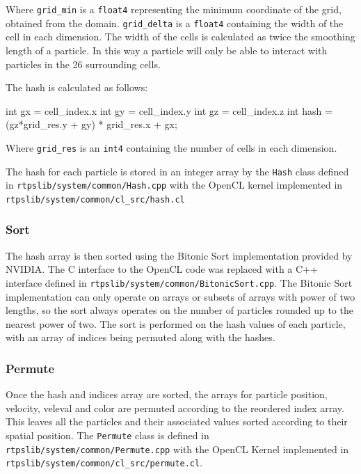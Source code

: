 Where \verb|grid_min| is a \verb|float4| representing the minimum coordinate of
the grid, obtained from the domain. \verb|grid_delta| is a \verb|float4|
containing the width of the cell in each dimension. The width of the cells is
calculated as twice the smoothing length of a particle. In this way a particle
will only be able to interact with particles in the 26 surrounding cells.


The hash is calculated as follows:
\begin{cppcode}{0}
int gx = cell_index.x
int gy = cell_index.y
int gz = cell_index.z
int hash = (gz*grid_res.y + gy) * grid_res.x + gx;
\end{cppcode}

Where \verb|grid_res| is an \verb|int4| containing the number of cells in each dimension.


The hash for each particle is stored in an integer array by the \verb|Hash|
class defined in \verb|rtpslib/system/common/Hash.cpp| with the OpenCL kernel
implemented in \\ \verb|rtpslib/system/common/cl_src/hash.cl|

\subsubsection{Sort}
The hash array is then sorted using the Bitonic Sort implementation provided by
NVIDIA\cite{NVBitonic}. The C interface to the OpenCL code was replaced with a
C++ interface defined in \verb|rtpslib/system/common/BitonicSort.cpp|. The
Bitonic Sort implementation can only operate on arrays or subsets of arrays
with power of two lengths, so the sort always operates on the number of
particles rounded up to the nearest power of two. The sort is performed on the
hash values of each particle, with an array of indices being permuted along
with the hashes.

\subsubsection{Permute}
Once the hash and indices array are sorted, the arrays for particle position,
velocity, veleval and color are permuted according to the reordered index
array. This leaves all the particles and their associated values sorted
according to their spatial position. The \verb|Permute| class is defined in
\verb|rtpslib/system/common/Permute.cpp| with the OpenCL Kernel implemented in
\verb|rtpslib/system/common/cl_src/permute.cl|.


